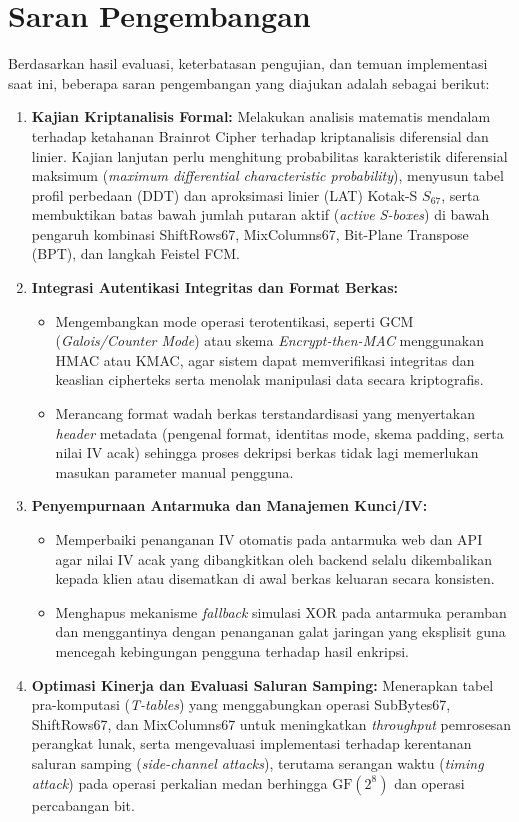 \section{Saran Pengembangan}
Berdasarkan hasil evaluasi, keterbatasan pengujian, dan temuan implementasi saat ini, beberapa saran pengembangan yang diajukan adalah sebagai berikut:
\begin{enumerate}
  \item \textbf{Kajian Kriptanalisis Formal:} Melakukan analisis matematis mendalam terhadap ketahanan Brainrot Cipher terhadap kriptanalisis diferensial dan linier. Kajian lanjutan perlu menghitung probabilitas karakteristik diferensial maksimum (\textit{maximum differential characteristic probability}), menyusun tabel profil perbedaan (DDT) dan aproksimasi linier (LAT) Kotak-S $S_{67}$, serta membuktikan batas bawah jumlah putaran aktif (\textit{active S-boxes}) di bawah pengaruh kombinasi ShiftRows67, MixColumns67, Bit-Plane Transpose (BPT), dan langkah Feistel FCM.

  \item \textbf{Integrasi Autentikasi Integritas dan Format Berkas:}
  \begin{itemize}
    \item Mengembangkan mode operasi terotentikasi, seperti GCM (\textit{Galois/Counter Mode}) atau skema \textit{Encrypt-then-MAC} menggunakan HMAC atau KMAC, agar sistem dapat memverifikasi integritas dan keaslian cipherteks serta menolak manipulasi data secara kriptografis.
    \item Merancang format wadah berkas terstandardisasi yang menyertakan \textit{header} metadata (pengenal format, identitas mode, skema padding, serta nilai IV acak) sehingga proses dekripsi berkas tidak lagi memerlukan masukan parameter manual pengguna.
  \end{itemize}

  \item \textbf{Penyempurnaan Antarmuka dan Manajemen Kunci/IV:}
  \begin{itemize}
    \item Memperbaiki penanganan IV otomatis pada antarmuka web dan API agar nilai IV acak yang dibangkitkan oleh backend selalu dikembalikan kepada klien atau disematkan di awal berkas keluaran secara konsisten.
    \item Menghapus mekanisme \textit{fallback} simulasi XOR pada antarmuka peramban dan menggantinya dengan penanganan galat jaringan yang eksplisit guna mencegah kebingungan pengguna terhadap hasil enkripsi.
  \end{itemize}

  \item \textbf{Optimasi Kinerja dan Evaluasi Saluran Samping:} Menerapkan tabel pra-komputasi (\textit{T-tables}) yang menggabungkan operasi SubBytes67, ShiftRows67, dan MixColumns67 untuk meningkatkan \textit{throughput} pemrosesan perangkat lunak, serta mengevaluasi implementasi terhadap kerentanan saluran samping (\textit{side-channel attacks}), terutama serangan waktu (\textit{timing attack}) pada operasi perkalian medan berhingga $\mathrm{GF}(2^8)$ dan operasi percabangan bit.
\end{enumerate}
